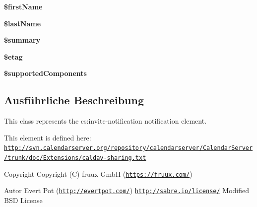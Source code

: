 \begin{DoxyCompactItemize}
\mbox{\label{class_sabre_1_1_cal_d_a_v_1_1_xml_1_1_notification_1_1_invite_a72adfcbe9b09036f6b16b0d25354b779}} 
{\bfseries \$first\+Name}
\item 
\mbox{\label{class_sabre_1_1_cal_d_a_v_1_1_xml_1_1_notification_1_1_invite_a116556e3a2e9555c6c242ea99d15e054}} 
{\bfseries \$last\+Name}
\item 
\mbox{\label{class_sabre_1_1_cal_d_a_v_1_1_xml_1_1_notification_1_1_invite_a79dfccdf1114cb94f66bc01d0f1ce7ea}} 
{\bfseries \$summary}
\item 
\mbox{\label{class_sabre_1_1_cal_d_a_v_1_1_xml_1_1_notification_1_1_invite_aaa379e7e22fbba10d841468a1a11475f}} 
{\bfseries \$etag}
\item 
\mbox{\label{class_sabre_1_1_cal_d_a_v_1_1_xml_1_1_notification_1_1_invite_a80aa2b503b0d59081166e24303dc5895}} 
{\bfseries \$supported\+Components}
\end{DoxyCompactItemize}


\subsection{Ausführliche Beschreibung}
This class represents the cs\+:invite-\/notification notification element.

This element is defined here\+: \href{http://svn.calendarserver.org/repository/calendarserver/CalendarServer/trunk/doc/Extensions/caldav-sharing.txt}{\tt http\+://svn.\+calendarserver.\+org/repository/calendarserver/\+Calendar\+Server/trunk/doc/\+Extensions/caldav-\/sharing.\+txt}

\begin{DoxyCopyright}{Copyright}
Copyright (C) fruux GmbH (\href{https://fruux.com/}{\tt https\+://fruux.\+com/}) 
\end{DoxyCopyright}
\begin{DoxyAuthor}{Autor}
Evert Pot (\href{http://evertpot.com/}{\tt http\+://evertpot.\+com/})  \href{http://sabre.io/license/}{\tt http\+://sabre.\+io/license/} Modified B\+SD License 
\end{DoxyAuthor}


